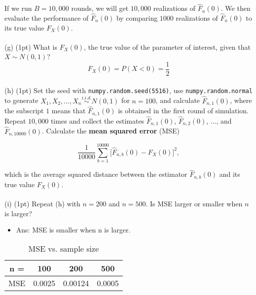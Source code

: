 \documentclass[11pt, oneside]{article}   	%
\begin{document}
If we run $B = 10,000$ rounds, we will get $10,000$ realizations of $\hat{F}_n(0)$. We then evaluate the performance of $\hat{F}_n(0)$ by comparing $1000$ realizations of $\hat{F}_n(0)$ to its true value $F_X(0).$

\paragraph{}
(g) (1pt) What is $F_X(0)$, the true value of the parameter of interest, 
given that $X \sim N(0,1)$?
\[
F_X(0) = P(X<0) = \frac{1}{2}
\]

\paragraph{}
(h) (1pt) Set the seed with \texttt{numpy.random.seed(5516)},
 use \texttt{numpy.random.normal} to generate $X_1, X_2, ..., X_n \overset{i.i.d.}{\sim} N(0,1)$ 
 for $n=100$, and calculate $\hat{F}_{n,1}(0)$, 
 where the subscript $1$ means that $\hat{F}_{n,1}(0)$ 
 is obtained in the first round of simulation. 
 Repeat $10,000$ times and collect the estimates $\hat{F}_{n,1}(0)$, $\hat{F}_{n,2}(0)$, 
 ..., and $\hat{F}_{n,10000}(0)$. 
 Calculate the \textbf{mean squared error} (MSE)

\[
\frac{1}{10000}\sum_{b=1}^{10000} \big[\hat{F}_{n,b}(0) - F_X(0)\big] ^ 2,
\]

which is the average squared distance between the estimator $\hat{F}_{n,b}(0)$ and its true value $F_X(0)$.

\paragraph{}
(i) (1pt) Repeat (h) with $n=200$ and $n=500$. Is MSE larger or smaller when $n$ is larger?
\begin{itemize}
    \item[] Ans: MSE is smaller when n is larger.
\end{itemize}

\begin{table}[htbp]
	\centering\begin{tabular}{|c|c|c|c|}
	\hline
	n = & 100 & 200 & 500 \\ \hline
	MSE & 0.0025   & 0.00124   & 0.0005  \\ \hline
	\end{tabular}
	\caption{MSE vs. sample size}
	\label{<label>}
\end{table}
\end{document}
